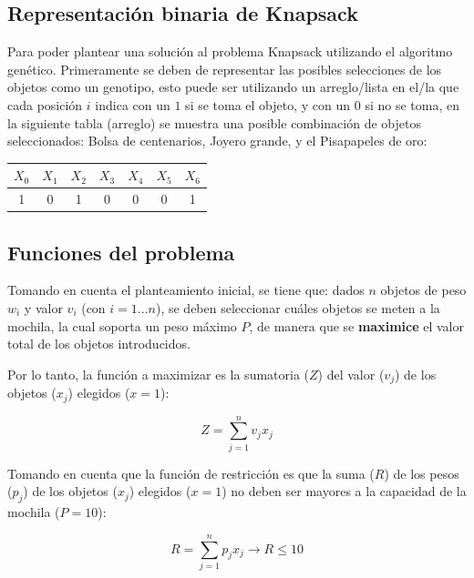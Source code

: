 \documentclass[a4paper, 12pt]{article}
\begin{document}
\subsection{Representación binaria de Knapsack}
Para poder plantear una solución al problema Knapsack utilizando el algoritmo genético. Primeramente se deben de representar las posibles selecciones de los objetos como un genotipo, esto puede ser utilizando un arreglo/lista en el/la que cada posición $i$ indica con un $1$ si se toma el objeto, y con un $0$ si no se toma, en la siguiente tabla (arreglo) se muestra una posible combinación de objetos seleccionados: Bolsa de centenarios, Joyero grande, y el Pisapapeles de oro:

\begin{table}[!ht]
    \centering
    \begin{tabular}{|c|c|c|c|c|c|c|}
        \hline
        $X_0$ & $X_1$ & $X_2$ & $X_3$ & $X_4$ & $X_5$ & $X_6$ \\
        \hline
        1     & 0     & 1     & 0     & 0     & 0     & 1     \\
        \hline
    \end{tabular}
\end{table}

\subsection{Funciones del problema}
Tomando en cuenta el planteamiento inicial, se tiene que: dados $n$ objetos de peso $w_i$ y valor $v_i$ (con $i=1...n$), se deben seleccionar cuáles objetos se meten a la mochila, la cual soporta un peso máximo $P$, de manera que se \textbf{maximice} el valor total de los objetos introducidos.

Por lo tanto, la función a maximizar es la sumatoria ($Z$) del valor ($v_j$) de los objetos ($x_j$) elegidos ($x=1$):

\begin{equation}\label{eq:1}
    Z = \sum_{j = 1}^{n}v_jx_j
\end{equation}

Tomando en cuenta que la función de restricción es que la suma ($R$) de los pesos ($p_j$) de los objetos ($x_j$) elegidos ($x=1$) no deben ser mayores a la capacidad de la mochila ($P=10$):

\begin{equation}\label{eq:2}
    R = \sum_{j = 1}^{n}p_jx_j \longrightarrow  R \leq 10
\end{equation}
\end{document}
